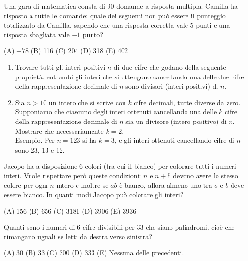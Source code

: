 \begin{esercizio}
    \label{ex:distrettuali_2018_1}
    Una gara di matematica consta di 90 domande a risposta multipla.
    Camilla ha risposto a tutte le domande: quale dei seguenti non può essere il punteggio totalizzato da Camilla,
    sapendo che una risposta corretta vale 5 punti e una risposta sbagliata vale $-1$ punto?

    (A) $-78$ \quad (B) 116 \quad (C) 204 \quad (D) 318 \quad (E) 402
\end{esercizio}

\begin{esercizio}
    \label{ex:distrettuali_2018_15}
    \begin{enumerate}
        \item Trovare tutti gli interi positivi $n$ di due cifre che godano della seguente proprietà: entrambi
        gli interi che si ottengono cancellando una delle due cifre della rappresentazione decimale
        di $n$ sono divisori (interi positivi) di $n$.
        \item Sia $n > 10$ un intero che si scrive con $k$ cifre decimali, tutte diverse da zero.
        Supponiamo che ciascuno degli interi ottenuti cancellando una delle $k$ cifre della rappresentazione decimale
        di $n$ sia un divisore (intero positivo) di $n$.
        Mostrare che necessariamente $k = 2$. \\
        Esempio.
        Per $n = 123$ si ha $k = 3$, e gli interi ottenuti cancellando cifre di $n$ sono 23, 13 e 12.
    \end{enumerate}
\end{esercizio}

\begin{esercizio}
    \label{ex:distrettuali_2019}
    Jacopo ha a disposizione 6 colori (tra cui il bianco) per colorare tutti i numeri interi.
    Vuole rispettare però queste condizioni: $n$ e $n + 5$ devono avere lo stesso colore per ogni $n$ intero e
    inoltre se $ab$ è bianco, allora almeno uno tra $a$ e $b$ deve essere bianco.
    In quanti modi Jacopo può colorare gli interi?

    (A) 156 \quad (B) 656 \quad (C) 3181 \quad (D) 3906 \quad (E) 3936
\end{esercizio}

\begin{esercizio}
    \label{ex:distrettuali_2021}
    Quanti sono i numeri di 6 cifre divisibili per 33 che siano palindromi, cioè che rimangano uguali
    se letti da destra verso sinistra?

    (A) 30 \quad (B) 33 \quad (C) 300 \quad (D) 333 \quad (E) Nessuna delle precedenti.
\end{esercizio}

